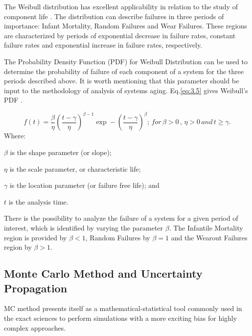 \documentclass{ws-m3as}
\begin{document}
The Weibull distribution has excellent applicability in relation to the study of component life \cite{Lai2006}. The distribution can describe failures in three periods of importance: Infant Mortality, Random Failures and Wear Failures. These regions are characterized by periods of exponential decrease in failure rates, constant failure rates and exponential increase in failure rates, respectively.

The Probability Density Function (PDF) for Weibull Distribution can be used to determine the probability of failure of each component of a system for the three periods described above. It is worth mentioning that this parameter should be input to the methodology of analysis of systems aging. Eq.\ref{eq:3.5} gives Weibull's PDF \cite{Rinne2008}.

\begin{equation}\label{eq:3.5}
f(t)=\frac{\beta}{\eta}\left(\frac{t-\gamma}{\eta}\right)^{\beta-1}\exp-\left(\frac{t-\gamma}{\eta}\right)^{\beta}; \hspace{2pt} for \hspace{2pt} \beta > 0\hspace{2pt},\hspace{2pt} \eta > 0 \hspace{2pt} and \hspace{2pt} t \geq \gamma.
\end{equation}
Where:
\begin{itemlist}
\item $\beta$ is the shape parameter (or slope);
\item $\eta$ is the scale parameter, or characteristic life;
\item $\gamma$ is the location parameter (or failure free life); and
\item $t$ is the analysis time.
\end{itemlist}	

There is the possibility to analyze the failure of a system for a given period of interest, which is identified by varying the parameter $\beta$. The Infantile Mortality  region is provided by $\beta<1$, Random Failures by $\beta=1$ and the Wearout Failures region by $\beta>1$. 

\subsection{Monte Carlo Method and Uncertainty Propagation}

MC method presents itself as a mathematical-statistical tool commonly used in the exact sciences to perform simulations \cite{Yoriyaz2009} with a more exciting bias for highly complex approaches.
\end{document}
